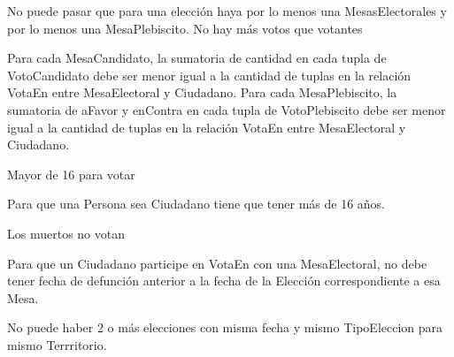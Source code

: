 No puede pasar que para una elección haya por lo menos una  MesasElectorales y por lo menos una MesaPlebiscito. 
No hay más votos que votantes

Para cada MesaCandidato, la sumatoria de cantidad en cada tupla de VotoCandidato debe ser menor igual a la cantidad de tuplas en la relación VotaEn entre MesaElectoral y Ciudadano.
Para cada MesaPlebiscito, la sumatoria de aFavor y enContra en cada tupla de VotoPlebiscito debe ser menor igual a la cantidad de tuplas en la relación VotaEn entre MesaElectoral y Ciudadano.

Mayor de 16 para votar

Para que una Persona sea Ciudadano tiene que tener más de 16 años.

Los muertos no votan

Para que un Ciudadano participe en VotaEn con una MesaElectoral, no debe tener fecha de defunción anterior a la fecha de la Elección correspondiente a esa Mesa.

No puede haber 2 o más  elecciones con misma fecha y mismo TipoEleccion para mismo Terrritorio. 

